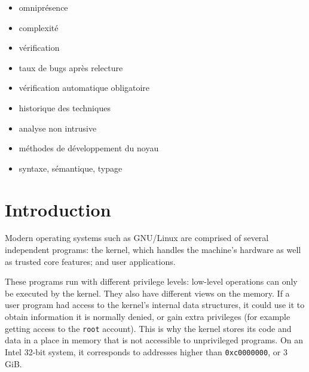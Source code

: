 \begin{itemize}
\item
  omniprésence
\item
  complexité
\item
  vérification
\item
  taux de bugs après relecture
\item
  vérification automatique obligatoire
\item
  historique des techniques
\item
  analyse non intrusive
\item
  méthodes de développement du noyau
\item
  syntaxe, sémantique, typage
\end{itemize}
























































\clearpage

\section{Introduction}

Modern operating systems such as GNU/Linux are comprised of several independent
programs: the kernel, which handles the machine's hardware as well as trusted
core features; and user applications.

These programs run with different privilege levels: low-level operations can
only be executed by the kernel. They also have different views on the memory. If
a user program had access to the kernel's internal data structures, it could use
it to obtain information it is normally denied, or gain extra privileges (for
example getting access to the \texttt{root} account). This is why the kernel
stores its code and data in a place in memory that is not accessible to
unprivileged programs. On an Intel 32-bit system, it corresponds to addresses
higher than \texttt{0xc0000000}, or 3 GiB.

